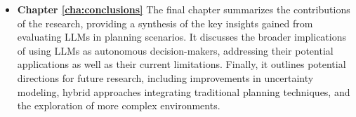 \begin{itemize}
  \item \textbf{Chapter \ref{cha:conclusions}} The final chapter summarizes the
    contributions of the research, providing a synthesis of the key insights gained
    from evaluating LLMs in planning scenarios. It discusses the broader
    implications of using LLMs as autonomous decision-makers, addressing their potential
    applications as well as their current limitations. Finally, it outlines potential
    directions for future research, including improvements in uncertainty
    modeling, hybrid approaches integrating traditional planning techniques, and
    the exploration of more complex environments.
\end{itemize}